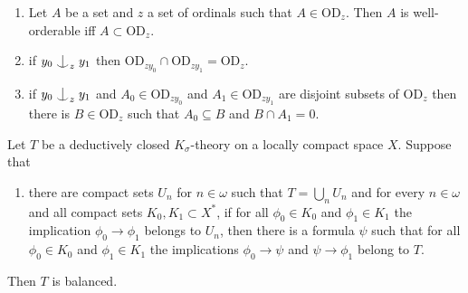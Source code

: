 \documentclass[10pt,a4paper]{amsart}
\newcommand{\forkindep}[1][]{%
  \mathrel{
    \mathop{
      \vcenter{
        \hbox{\oalign{\noalign{\kern-.3ex}\hfil$\vert$\hfil\cr
              \noalign{\kern-.7ex}
              $\smile$\cr\noalign{\kern-.3ex}}}
      }
    }\displaylimits_{#1}
  }
}
\newcommand{\gs}{\sigma}
\newcommand{\gw}{\omega}
\newcommand{\vd}{\mathrm{OD}}
\begin{document}
	\begin{fact}
		\label{facticfact}
		\begin{enumerate}
			\item Let $A$ be a set and $z$ a set of ordinals such that $A\in\vd_z$. Then $A$ is well-orderable iff $A\subset\vd_z$.
			\item if $y_0\forkindep_z y_1$ then $\vd_{zy_0}\cap\vd_{zy_1}=\vd_z$.
			\item if $y_0\forkindep_z y_1$ and $A_0\in \vd_{zy_0}$ and $A_1\in\vd_{zy_1}$ are disjoint subsets of $\vd_z$ then there is $B\in\vd_z$ such that $A_0\subseteq B$ and $B\cap A_1=0$.	\end{enumerate}
	\end{fact}

\begin{theorem}
\label{ksigmacriterion}
Let $T$ be a deductively closed $K_\gs$-theory on a locally compact space $X$. Suppose that

\begin{enumerate}
\item[(*)] there are compact sets $U_n$ for $n\in\gw$ such that  $T=\bigcup_nU_n$ and for every $n\in\gw$ and all compact sets $K_0, K_1\subset X^*$, if for all $\phi_0\in K_0$ and $\phi_1\in K_1$ the implication $\phi_0\to\phi_1$ belongs to $U_n$, then there is a formula $\psi$ such that for all $\phi_0\in K_0$ and $\phi_1\in K_1$ the implications $\phi_0\to\psi$ and $\psi\to\phi_1$ belong to $T$.
\end{enumerate}

\noindent Then $T$ is balanced.
\end{theorem}
\end{document}
